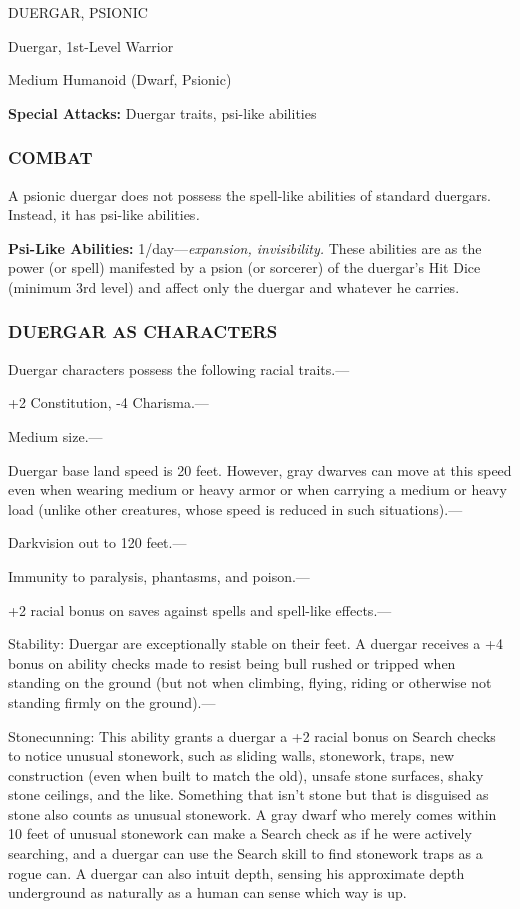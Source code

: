 \documentclass{article}
\begin{document}
\vspace{12pt}
\parindent=0pt
{\LARGE{}DUERGAR, PSIONIC}

Duergar, 1st-Level Warrior

Medium Humanoid (Dwarf, Psionic) 

\textbf{Special Attacks:} Duergar traits, psi-like abilities

\subsubsection*{COMBAT}

A psionic duergar does not possess the spell-like abilities of standard duergars. 
Instead, it has psi-like abilities\textit{.}

\textbf{Psi-Like Abilities:} 1/day---\textit{expansion, invisibility. }These abilities 
are as the power (or spell) manifested by a psion (or sorcerer) of the duergar's 
Hit Dice (minimum 3rd level) and affect only the duergar and whatever he carries.

\subsubsection*{DUERGAR AS CHARACTERS}

Duergar characters possess the following racial traits.--- 

\parindent=3pt
+2 Constitution, -4 Charisma.---

\parindent=0pt
Medium size.---

Duergar base land speed is 20 feet. However, gray dwarves can move at this speed 
even when wearing medium or heavy armor or when carrying a medium or heavy load 
(unlike other creatures, whose speed is reduced in such situations).---

Darkvision out to 120 feet.---

Immunity to paralysis, phantasms, and poison.--- 

\parindent=3pt
+2 racial bonus on saves against spells and spell-like effects.---

\parindent=0pt
Stability: Duergar are exceptionally stable on their feet. A duergar receives a 
+4 bonus on ability checks made to resist being bull rushed or tripped when standing 
on the ground (but not when climbing, flying, riding or otherwise not standing 
firmly on the ground).---

Stonecunning: This ability grants a duergar a +2 racial bonus on Search checks 
to notice unusual stonework, such as sliding walls, stonework, traps, new construction 
(even when built to match the old), unsafe stone surfaces, shaky stone ceilings, 
and the like. Something that isn't stone but that is disguised as stone also counts 
as unusual stonework. A gray dwarf who merely comes within 10 feet of unusual stonework 
can make a Search check as if he were actively searching, and a duergar can use 
the Search skill to find stonework traps as a rogue can. A duergar can also intuit 
depth, sensing his approximate depth underground as naturally as a human can sense 
which way is up.
\end{document}
